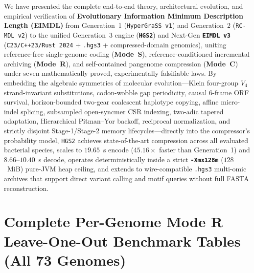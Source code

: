 \documentclass[10pt]{article}
\theoremstyle{definition}
\begin{document}
We have presented the complete end-to-end theory, architectural evolution, and empirical verification of \textbf{Evolutionary Information Minimum Description Length (EIMDL)} from Generation~1 (\texttt{HyperGraSS v1}) and Generation~2 (\texttt{RC-MDL v2}) to the unified Generation~3 engine (\textbf{\texttt{HGS2}}) and Next-Gen \textbf{\texttt{EIMDL v3}} (\texttt{C23/C++23/Rust~2024} + \texttt{.hgs3} + compressed-domain genomics), uniting reference-free single-genome coding (\textbf{Mode~S}), reference-conditioned incremental archiving (\textbf{Mode~R}), and self-contained pangenome compression (\textbf{Mode~C}) under seven mathematically proved, experimentally falsifiable laws. By embedding the algebraic symmetries of molecular evolution---Klein four-group $V_4$ strand-invariant substitutions, codon-wobble gap periodicity, causal 6-frame ORF survival, horizon-bounded two-gear coalescent haplotype copying, affine micro-indel splicing, subsampled open-syncmer CSR indexing, two-adic tapered adaptation, Hierarchical Pitman--Yor backoff, reciprocal normalization, and strictly disjoint Stage-1/Stage-2 memory lifecycles---directly into the compressor's probability model, \texttt{HGS2} achieves state-of-the-art compression across all evaluated bacterial species, scales to $19.65$~s encode ($45.16\times$ faster than Generation~1) and $8.66\text{--}10.40$~s decode, operates deterministically inside a strict \textbf{\texttt{-Xmx128m}} ($128$~MiB) pure-JVM heap ceiling, and extends to wire-compatible \texttt{.hgs3} multi-omic archives that support direct variant calling and motif queries without full FASTA reconstruction.




\clearpage
\appendix
\section{Complete Per-Genome Mode R Leave-One-Out Benchmark Tables (All 73 Genomes)}
\end{document}
